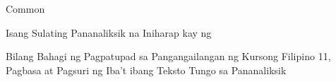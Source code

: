 \documentclass {article}
\begin{document}
 {Common}
\begin {titlepage}
  \centering
	{\huge \researchtitle

  }
  \vfill
  {\LARGE Isang Sulating Pananaliksik na Iniharap kay \teacher ng

    \uppercase{\school}

  }
  \vspace{1cm}
  {\LARGE Bilang Bahagi ng Pagpatupad sa Pangangailangan ng Kursong
    Filipino 11, Pagbasa at Pagsuri ng Iba't ibang Teksto Tungo sa Pananaliksik

  }
  \vfill
  {\Large\itshape \authors

  }
\end {titlepage}
\end{document}
